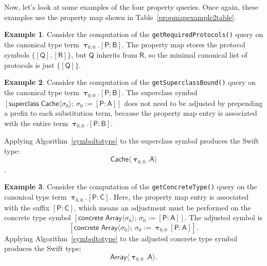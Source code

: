 \documentclass[headsepline,bibliography=totoc]{scrreport}
\newcommand{\namesym}[1]{\mathsf{#1}}
\newcommand{\proto}[1]{\bm{\mathsf{#1}}}
\newcommand{\protosym}[1]{[\proto{#1}]}
\newcommand{\genericsym}[2]{\bm{\uptau}_{#1,#2}}
\newcommand{\assocsym}[2]{[\proto{#1}\colon\namesym{#2}]}
\newcommand{\supersym}[1]{[\mathsf{superclass}\;#1]}
\newcommand{\concretesym}[1]{[\mathsf{concrete}\;#1]}
\theoremstyle{definition}
\newtheorem{example}{Example}[chapter]
\theoremstyle{definition}
\theoremstyle{definition}
\begin{document}
Now, let's look at some examples of the four property queries. Once again, these examples use the property map shown in Table~\ref{propmapexample2table}.
\begin{example}
Consider the computation of the \texttt{getRequiredProtocols()} query on the canonical type term $\genericsym{0}{0}.\assocsym{P}{B}$. The property map stores the protocol symbols $\{\protosym{Q},\protosym{R}\}$, but $\proto{Q}$ inherits from $\proto{R}$, so the minimal canonical list of protocols is just $\{\protosym{Q}\}$.
\end{example}
\begin{example}
Consider the computation of the \texttt{getSuperclassBound()} query on the canonical type term $\genericsym{0}{0}.\assocsym{P}{B}$.
The superclass symbol $\supersym{\namesym{Cache}\langle\sigma_0\rangle;\,\sigma_0:=\assocsym{P}{A}}$ does not need to be adjusted by prepending a prefix to each substitution term, because the property map entry is associated with the entire term $\genericsym{0}{0}.\assocsym{P}{B}$.

Applying Algorithm~\ref{symboltotype} to the superclass symbol produces the Swift type:
\[\namesym{Cache}\langle\genericsym{0}{0}.\namesym{A}\rangle\].
\end{example}
\begin{example}
Consider the computation of the \texttt{getConcreteType()} query on the canonical type term $\genericsym{0}{0}.\assocsym{P}{C}$. Here, the property map entry is associated with the suffix $\assocsym{P}{C}$, which means an adjustment must be performed on the concrete type symbol 
$\concretesym{\namesym{Array}\langle\sigma_0\rangle;\,\sigma_0:=\assocsym{P}{A}}$. The adjusted symbol is
\[\concretesym{\namesym{Array}\langle\sigma_0\rangle;\,\sigma_0:=\genericsym{0}{0}\assocsym{P}{A}}.\]
Applying Algorithm~\ref{symboltotype} to the adjusted concrete type symbol produces the Swift type:
\[\namesym{Array}\langle\genericsym{0}{0}.\namesym{A}\rangle.\]
\end{example}
\end{document}
